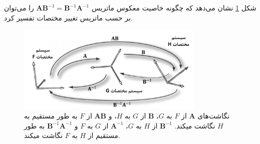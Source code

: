 {\begin{spacing}{1.5}
        شکل \ref{fig:4.Session.1.3.14} نشان می‌دهد که چگونه خاصیت معکوس ماتریس $\textbf{AB}^{-1}=\textbf{B}^{-1}\textbf{A}^{-1}$ را می‌توان بر حسب ماتریس تغییر‌ مختصات تفسیر کرد.

        \begin{figure}[H]
            \centering
            \setlength{\belowcaptionskip}{-10pt}
            \includegraphics[width=0.8\textwidth]{Images/4/3/4.Session.1.3.14}
            \caption {نگاشت‌های $\textbf{A}$ از $F$ به $G$، $\textbf{B}$ از $G$ به $H$، و $\textbf{AB}$ از $F$ به طور مستقیم به $H$ نگاشت میکند. $\textbf{B}^{-1}$ از $H$ به $G$، $\textbf{A}^{-1}$ از $G$ به $F$ و $\textbf{B}^{-1}\textbf{A}^{-1}$ به طور مستقیم از $H$ به $F$ نگاشت میکند.}
            \label{fig:4.Session.1.3.14}
        \end{figure}
    \end{spacing}
}


